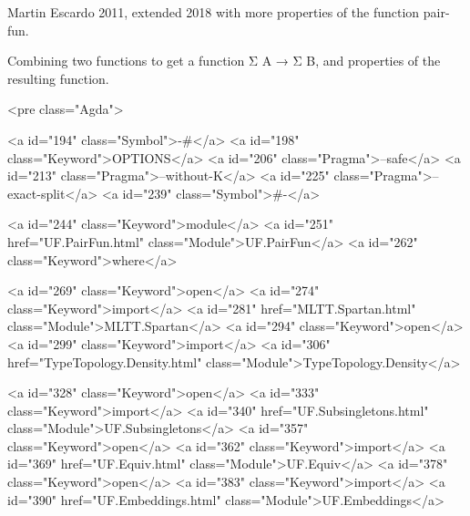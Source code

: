 Martin Escardo 2011, extended 2018 with more properties of the function pair-fun.

Combining two functions to get a function Σ A → Σ B, and properties of
the resulting function.

<pre class="Agda">

<a id="194" class="Symbol">{-#</a> <a id="198" class="Keyword">OPTIONS</a> <a id="206" class="Pragma">--safe</a> <a id="213" class="Pragma">--without-K</a> <a id="225" class="Pragma">--exact-split</a> <a id="239" class="Symbol">#-}</a>

<a id="244" class="Keyword">module</a> <a id="251" href="UF.PairFun.html" class="Module">UF.PairFun</a> <a id="262" class="Keyword">where</a>

<a id="269" class="Keyword">open</a> <a id="274" class="Keyword">import</a> <a id="281" href="MLTT.Spartan.html" class="Module">MLTT.Spartan</a>
<a id="294" class="Keyword">open</a> <a id="299" class="Keyword">import</a> <a id="306" href="TypeTopology.Density.html" class="Module">TypeTopology.Density</a>

<a id="328" class="Keyword">open</a> <a id="333" class="Keyword">import</a> <a id="340" href="UF.Subsingletons.html" class="Module">UF.Subsingletons</a>
<a id="357" class="Keyword">open</a> <a id="362" class="Keyword">import</a> <a id="369" href="UF.Equiv.html" class="Module">UF.Equiv</a>
<a id="378" class="Keyword">open</a> <a id="383" class="Keyword">import</a> <a id="390" href="UF.Embeddings.html" class="Module">UF.Embeddings</a>

